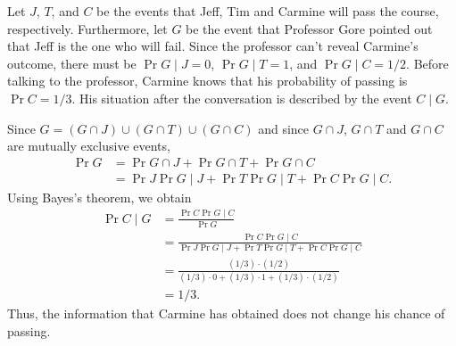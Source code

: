 \starred
Let $J$, $T$, and $C$ be the events that Jeff, Tim and Carmine will pass the course, respectively.
Furthermore, let $G$ be the event that Professor Gore pointed out that Jeff is the one who will fail.
Since the professor can't reveal Carmine's outcome, there must be $\Pr{G\mid J}=0$, $\Pr{G\mid T}=1$, and $\Pr{G\mid C}=1/2$.
Before talking to the professor, Carmine knows that his probability of passing is $\Pr{C}=1/3$.
His situation after the conversation is described by the event $C\mid G$.

Since $G=(G\cap J)\cup(G\cap T)\cup(G\cap C)$ and since $G\cap J$, $G\cap T$ and $G\cap C$ are mutually exclusive events,
\begin{align*}
    \Pr{G} &= \Pr{G\cap J}+\Pr{G\cap T}+\Pr{G\cap C} \\
    &= \Pr{J}\Pr{G\mid J}+\Pr{T}\Pr{G\mid T}+\Pr{C}\Pr{G\mid C}.
\end{align*}
Using Bayes's theorem, we obtain
\begin{align*}
    \Pr{C\mid G} &= \frac{\Pr{C}\Pr{G\mid C}}{\Pr{G}} \\
    &= \frac{\Pr{C}\Pr{G\mid C}}{\Pr{J}\Pr{G\mid J}+\Pr{T}\Pr{G\mid T}+\Pr{C}\Pr{G\mid C}} \\[2mm]
    &= \frac{(1/3)\cdot(1/2)}{(1/3)\cdot0+(1/3)\cdot1+(1/3)\cdot(1/2)} \\[1mm]
    &= 1/3.
\end{align*}
Thus, the information that Carmine has obtained does not change his chance of passing.
